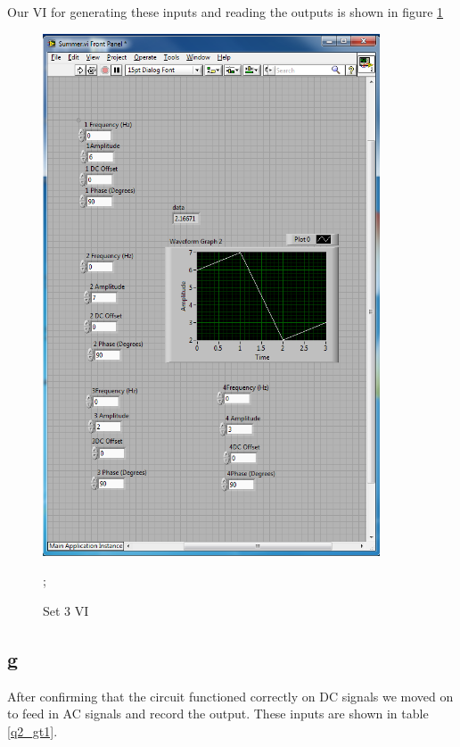 \documentclass{article}
\theoremstyle{plain}
\theoremstyle{definition}
\theoremstyle{remark}
\begin{document}
Our VI for generating these inputs and reading the outputs is shown in figure \ref{q2_f2}

\begin{figure}[h]
\begin{center}
\includegraphics[width = 10cm]{set3problem2.png}
\end{center}
\caption{Set 3 VI};
\label{q2_f2}
\end{figure}


\subsection*{g}
After confirming that the circuit functioned correctly on DC signals we moved on to feed in AC signals and record the output.  These inputs are shown in table \ref{q2_gt1}.
\end{document}
